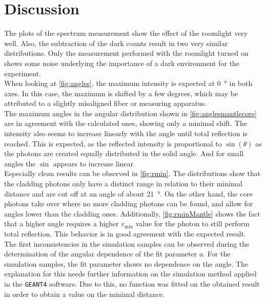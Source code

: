 \section{Discussion}
\label{sec:Discussion}

The plots of the spectrum measurement show the effect of the roomlight very well. Also, the subtraction of the dark counts result in two very similar distributions. Only the measurement performed with the roomlight turned on shows some noise underlying the importance of a dark environment for the experiment.\\
When looking at \autoref{fig:angles}, the maximum intensity is expected at \qty{0}{\degree} in both axes. In this case, the maximum is shifted by a few degrees, which may be attributed to a slightly misaligned fiber or measuring apparatus.\\
The maximum angles in the angular distribution shown in \autoref{fig:anglesmantlecore} are in agreement with the calculated ones, showing only a minimal shift. 
The intensity also seems to increase linearly with the angle until total reflection is reached. This is expected, as the reflected intensity is proportional to $\sin(\theta)$ as the photons are created equally distributed in the solid angle. And for small angles the $\sin$ appears to increase linear.\\%
Especially clean results can be observed in \autoref{fig:rmin}. The distributions show that the cladding photons only have a distinct range in relation to their minimal distance and are cut off at an angle of about \qty{21}{\degree}. On the other hand, the core photons take over where no more cladding photons can be found, and allow for angles lower than the cladding ones. Additionally, \autoref{fig:rminMantle} shows the fact that a higher angle requires a higher $r_\mathrm{min}$ value for the photon to still perform total reflection. This behavior is in good agreement with the expected result.\\
The first inconsistencies in the simulation samples can be observed during the determination of the angular dependence of the fit parameter $a$. For the simulation samples, the fit parameter shows no dependence on the angle. The explanation for this needs further information on the simulation method applied in the \texttt{GEANT4} software. Due to this, no function was fitted on the obtained result in order to obtain a value on the minimal distance.\\
